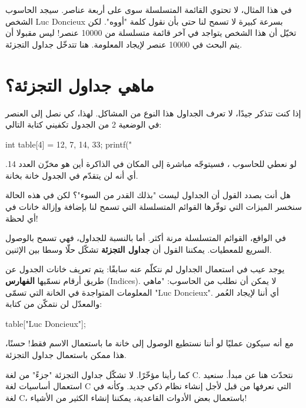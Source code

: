 في هذا المثال، لا تحتوي القائمة المتسلسلة سوى على أربعة عناصر. سيجد الحاسوب الشخص 
\textenglish{Luc Doncieux}
بسرعة كبيرة لا تسمح لنا حتى بأن نقول كلمة "أووه". لكن تخيّل أن هذا الشخص يتواجد في آخر قائمة متسلسلة من 10000 عنصر! ليس مقبولا أن يتم البحث في 10000 عنصر لإيجاد المعلومة. هنا تتدخّل جداول التجزئة.

\section{ماهي جداول التجزئة؟}

إذا كنت تتذكر جيدًا، لا تعرف الجداول هذا النوع من المشاكل. لهذا، كي نصل إلى العنصر في الوضعية 2 من الجدول تكفيني كتابة التالي:

\begin{Csource}
int table[4] = {12, 7, 14, 33};
printf("%
\end{Csource}

لو نعطي للحاسوب
،
فسيتوجّه مباشرة إلى المكان في الذاكرة أين هو مخزّن العدد 14. أي أنه لن يتقدّم في الجدول خانة بخانة.

\begin{question}
هل أنت بصدد القول أن الجداول ليست "بذلك القدر من السوء"؟ لكن في هذه الحالة سنخسر الميزات التي توفّرها القوائم المتسلسلة التي تسمح لنا بإضافة وإزالة خانات في أي لحظة!
\end{question}

في الواقع، القوائم المتسلسلة مرنة أكثر. أما بالنسبة للجداول، فهي تسمح بالوصول السريع للمعطيات. يمكننا القول أن 
\textbf{جداول التجزئة}
تشكّل حلّا وسطا بين الإثنين.

يوجد عيب في استعمال الجداول لم نتكلّم عنه سابقًا: يتم تعريف خانات الجدول عن طريق أرقام نسمّيها 
\textbf{الفهارس}
(\textenglish{Indices}).
لا يمكن أن نطلب من الحاسوب: "ماهي المعلومات المتواجدة في الخانة التي تسمّى
"\textenglish{Luc Doncieux}".
أي أننا لإيجاد العُمر والمعدّل لن نتمكّن من كتابة:

\begin{Csource}
table["Luc Doncieux"];
\end{Csource}

مع أنه سيكون عمليًا لو أننا نستطيع الوصول إلى خانة ما باستعمال الاسم فقط! حسنًا، هذا ممكن باستعمال جداول التجزئة.

\begin{information}
كما رأينا مؤخّرًا. لا تشكّل جداول التجزئة "جزءً" من لغة
\textenglish{C}.
نتحدّث هنا عن مبدأ. سنعيد استعمال أساسيات لغة
\textenglish{C}
التي نعرفها من قبل لأجل إنشاء نظام ذكي جديد. وكأنه في لغة
\textenglish{C}،
باستعمال بعض الأدوات القاعدية، يمكننا إنشاء الكثير من الأشياء!
\end{information}

